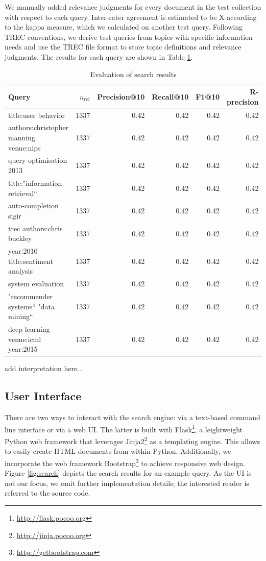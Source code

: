 \documentclass{sig-alternate-05-2015}
\begin{document}
We manually added relevance judgments for every document in the test collection with respect to each query. Inter-rater agreement is estimated to be X according to the kappa measure, which we calculated on another test query. Following TREC conventions, we derive test queries from topics with specific information needs and use the TREC file format to store topic definitions and relevance judgments. The results for each query are shown in Table \ref{tbl:evalsearch}.

\begin{table}[th]
\centering
\caption{Evaluation of search results} \label{tbl:evalsearch}
\begin{tabular}{lrrrrr}
Query & $n_\text{rel}$ & Precision@10 & Recall@10 & F1@10 & R-precision \\
\hline
title:user behavior & 1337 & 0.42 & 0.42 & 0.42 & 0.42 \\
authors:christopher manning venue:nips & 1337 & 0.42 & 0.42 & 0.42 & 0.42 \\
query optimisation 2013 & 1337 & 0.42 & 0.42 & 0.42 & 0.42 \\
title:"information retrieval`` & 1337 & 0.42 & 0.42 & 0.42 & 0.42 \\
auto-completion sigir & 1337 & 0.42 & 0.42 & 0.42 & 0.42 \\
trec authors:chris buckley & 1337 & 0.42 & 0.42 & 0.42 & 0.42 \\
year:2010 title:sentiment analysis & 1337 & 0.42 & 0.42 & 0.42 & 0.42 \\
system evaluation & 1337 & 0.42 & 0.42 & 0.42 & 0.42 \\
"recommender systems`` "data mining`` & 1337 & 0.42 & 0.42 & 0.42 & 0.42 \\
deep learning venue:icml year:2015 & 1337 & 0.42 & 0.42 & 0.42 & 0.42 \\
\end{tabular}
\end{table}

add interpretation here...   

\subsection{User Interface}

There are two ways to interact with the search engine: via a text-based command line interface or via a web UI. The latter is built with Flask\footnote{\url{http://flask.pocoo.org}}, a leightweight Python web framework that leverages Jinja2\footnote{\url{http://jinja.pocoo.org}} as a templating engine. This allows to easily create HTML documents from within Python. Additionally, we incorporate the web framework Bootstrap\footnote{\url{http://getbootstrap.com}} to achieve responsive web design. Figure \ref{fig:search} depicts the search results for an example query. As the UI is not our focus, we omit further implementation details; the interested reader is referred to the source code.
\end{document}
